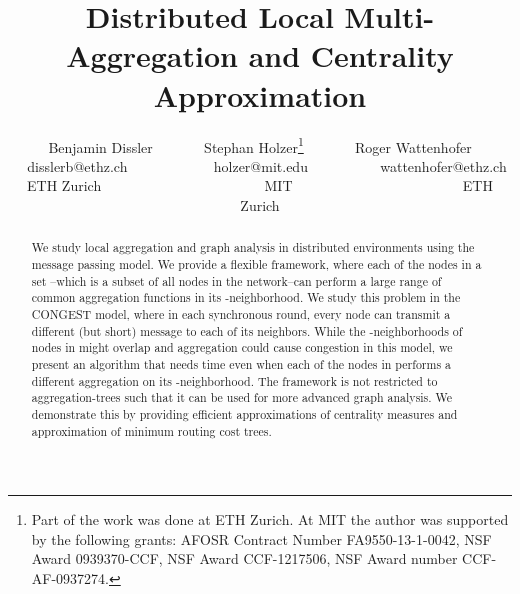 \documentclass[11pt]{article}
\newif\iffull
\begin{document}
\author{Benjamin Dissler ~~~~~~  Stephan Holzer\thanks{Part of the work was done at ETH Zurich. At MIT the author was supported by the following grants: AFOSR Contract Number FA9550-13-1-0042, NSF Award 0939370-CCF, NSF Award CCF-1217506, NSF Award number CCF-AF-0937274.}  ~~~~~~ Roger Wattenhofer\\
~~\small disslerb@ethz.ch ~~~~~~~~~~~ \small holzer@mit.edu  ~~~~~~~~~  \small wattenhofer@ethz.ch\\
  \small ETH Zurich  ~~~~~~~~~~~~~~~~~~~~~~  MIT  ~~~~~~~~~~~~~~~~~~~~~~~  ETH Zurich\\
}

\title{
Distributed Local Multi-Aggregation and Centrality Approximation
}
\maketitle
\thispagestyle{empty}
\begin{abstract}
We study local aggregation and graph analysis in distributed environments using the message passing model. We provide a flexible framework, where each of the nodes in a set --which is a subset of all nodes in the network--can perform a large range of common aggregation functions in its -neighborhood. We study this problem in the CONGEST model, where in each synchronous round, every node can transmit a different (but short) message to each of its neighbors. While the -neighborhoods of nodes in  might overlap and aggregation could cause congestion in this model, we present an algorithm that needs time  even when each of the nodes in  performs a different aggregation on its -neighborhood. The framework is not restricted to aggregation-trees such that it can be used for more advanced graph analysis. We demonstrate this by providing efficient approximations of centrality measures and approximation of minimum routing cost trees.
\end{abstract}

\clearpage
\pagestyle{plain}
\setcounter{page}{1}






\newpage
\fulltrue 
\end{document}
